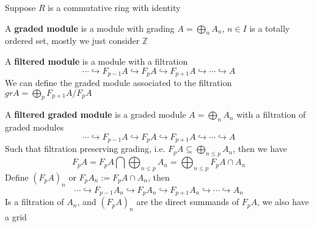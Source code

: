 \documentclass[../main.tex]{subfiles}
\begin{document}
\begin{definition}
Suppose $R$ is a commutative ring with identity \par
A \textbf{graded module} is a module with grading $A=\bigoplus_{n}A_n$, $n\in I$ is a totally ordered set, mostly we just consider $\mathbb Z$ \par
A \textbf{filtered module} is a module with a filtration
\[\cdots\hookrightarrow F_{p-1}A\hookrightarrow F_pA\hookrightarrow F_{p+1}A\hookrightarrow\cdots\hookrightarrow A\]
We can define the graded module associated to the filtration $grA=\bigoplus_p F_{p+1}A/F_pA$ \par
A \textbf{filtered graded module} is a graded module $A=\bigoplus_{n}A_n$ with a filtration of graded modules
\[\cdots\hookrightarrow F_{p-1}A\hookrightarrow F_pA\hookrightarrow F_{p+1}A\hookrightarrow\cdots\hookrightarrow A\]
Such that filtration preserving grading, i.e. $\displaystyle F_pA\subseteq\bigoplus_{n\leq p}A_n$, then we have
\[\displaystyle F_pA=F_pA\bigcap\bigoplus_{n\leq p}A_n=\bigoplus_{n\leq p}F_pA\cap A_n\]
Define $(F_pA)_n$ or $F_pA_n:=F_pA\cap A_n$, then
\[\cdots\hookrightarrow F_{p-1}A_n\hookrightarrow F_{p}A_n\hookrightarrow F_{p+1}A_n\hookrightarrow\cdots\hookrightarrow A_n\]
Is a filtration of $A_n$, and $(F_pA)_n$ are the direct summands of $F_pA$, we also have a grid
\begin{center}
\end{center}
\end{definition}
\end{document}
